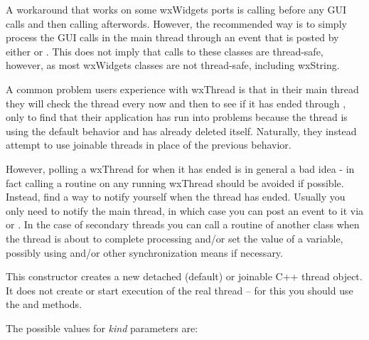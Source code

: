 A workaround that works on some wxWidgets ports is calling  
before any GUI calls and then calling  afterwords. However,
the recommended way is to simply process the GUI calls in the main thread 
through an event that is posted by either  or
. This does 
not imply that calls to these classes are thread-safe, however, as most 
wxWidgets classes are not thread-safe, including wxString.

\label{dontpollwxthread}

A common problem users experience with wxThread is that in their main thread
they will check the thread every now and then to see if it has ended through
, only to find that their 
application has run into problems because the thread is using the default
behavior and has already deleted itself. Naturally, they instead attempt to
use joinable threads in place of the previous behavior.

However, polling a wxThread for when it has ended is in general a bad idea -
in fact calling a routine on any running wxThread should be avoided if 
possible. Instead, find a way to notify yourself when the thread has ended.
Usually you only need to notify the main thread, in which case you can post
an event to it via  or
. In 
the case of secondary threads you can call a routine of another class
when the thread is about to complete processing and/or set the value
of a variable, possibly using  and/or other 
synchronization means if necessary.

\label{wxthreadctor}


This constructor creates a new detached (default) or joinable C++ thread object. It
does not create or start execution of the real thread -- for this you should
use the  and  methods.

The possible values for {\it kind} parameters are:

\twocolwidtha{7cm}
\begin{twocollist}\itemsep=0pt
\end{twocollist}


